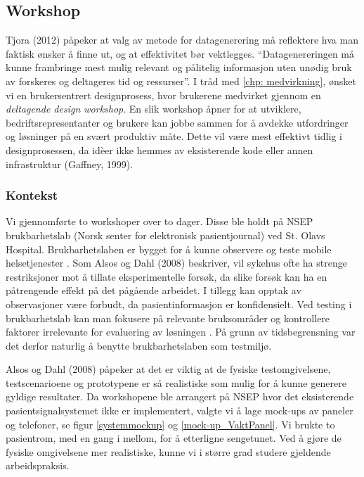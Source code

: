 \subsection{Workshop}
\label{workshops}

Tjora (2012) påpeker at valg av metode for datagenerering må reflektere hva man faktisk ønsker å finne ut, og at effektivitet bør vektlegges. “Datagenereringen må kunne frambringe mest mulig relevant og pålitelig informasjon uten unødig bruk av forskeres og deltageres tid og ressurser”.
I tråd med \ref{chp: medvirkning}, ønsket vi en brukersentrert designprosess, hvor brukerene medvirket gjennom en \emph{deltagende design workshop}.
En slik workshop åpner for at utviklere, bedriftsrepresentanter og brukere kan jobbe sammen for å avdekke utfordringer og løsninger på en svært produktiv måte. Dette vil være mest effektivt tidlig i designprosessen, da idèer ikke hemmes av eksisterende kode eller annen infrastruktur (Gaffney, 1999).

\subsubsection{Kontekst}
Vi gjennomførte to workshoper over to dager. Disse ble holdt på NSEP brukbarhetslab (Norsk senter for elektronisk pasientjournal) ved St. Olavs Hospital. Brukbarhetslaben er bygget for å kunne observere og teste mobile helsetjenester \cite{NSEP}.
Som Alsos og Dahl (2008) beskriver, vil sykehus ofte ha strenge restriksjoner mot å tillate eksperimentelle forsøk, da slike forsøk kan ha en påtrengende effekt på det pågående arbeidet. I tillegg kan opptak av observasjoner være forbudt, da pasientinformasjon er konfidensielt. Ved testing i brukbarhetslab kan man fokusere på relevante bruksområder og kontrollere faktorer irrelevante for evaluering av løsningen \cite{Alsos08}. På grunn av tidsbegrensning var det derfor naturlig å benytte brukbarhetslaben som testmiljø.   

\noindent
Alsos og Dahl (2008) påpeker at det er viktig at de fysiske testomgivelsene, testscenarioene og prototypene er så realistiske som mulig for å kunne generere gyldige resultater. Da workshopene ble arrangert på NSEP hvor det eksisterende pasientsignalsystemet ikke er implementert, valgte vi å lage mock-ups av paneler og telefoner, se figur \ref{systemmockup} og \ref{mock-up_VaktPanel}. Vi brukte to pasientrom, med en gang i mellom, for å etterligne sengetunet. Ved å gjøre de fysiske omgivelsene mer realistiske, kunne vi i større grad studere gjeldende arbeidspraksis.

